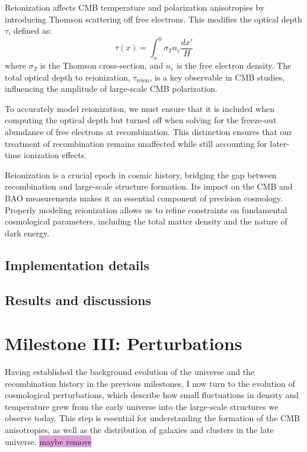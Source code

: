 \documentclass{aa}
\begin{document}
Reionization affects CMB temperature and polarization anisotropies by introducing Thomson scattering off free electrons. This modifies the optical depth $\tau$, defined as:
\begin{equation}
\tau(x) = \int_x^0 \sigma_T n_e \frac{dx'}{H}
\end{equation}
where $\sigma_T$ is the Thomson cross-section, and $n_e$ is the free electron density. The total optical depth to reionization, $\tau_\text{reion}$, is a key observable in CMB studies, influencing the amplitude of large-scale CMB polarization.

To accurately model reionization, we must ensure that it is included when computing the optical depth but turned off when solving for the freeze-out abundance of free electrons at recombination. This distinction ensures that our treatment of recombination remains unaffected while still accounting for later-time ionization effects.

Reionization is a crucial epoch in cosmic history, bridging the gap between recombination and large-scale structure formation. Its impact on the CMB and BAO measurements makes it an essential component of precision cosmology. Properly modeling reionization allows us to refine constraints on fundamental cosmological parameters, including the total matter density and the nature of dark energy.
\color{black}











\subsection{Implementation details}\label{subsec: II methods}

\subsection{Results and discussions}\label{subsec: II results}






\section{Milestone III: Perturbations}\label{sec: milestone III}
Having established the background evolution of the universe and the recombination history in the previous milestones, I now turn to the evolution of cosmological perturbations, which describe how small fluctuations in density and temperature grew from the early universe into the large-scale structures we observe today. This step is essential for understanding the formation of the CMB anisotropies, as well as the distribution of galaxies and clusters in the late universe. \colorbox{Plum}{maybe remove}
\end{document}

